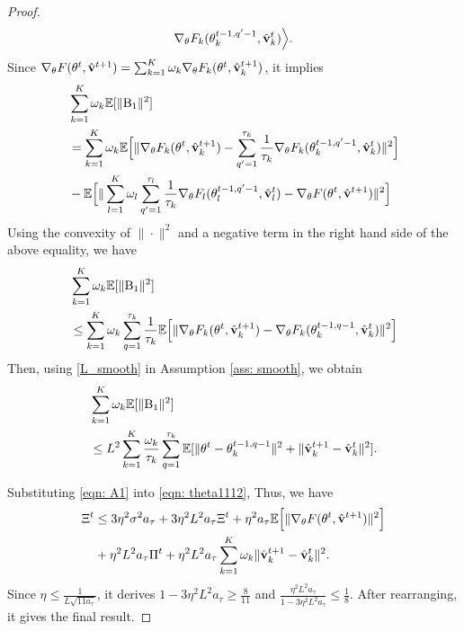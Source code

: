 \documentclass[twoside,journal]{IEEEtran}
\def\VectorFont{\bf}
\newcommand{\vv}{{\VectorFont v}}
\begin{document}
\begin{proof}
\begin{align}
\nabla_{\theta} F_k(\theta_k^{t-1,q^\prime-1}, \hat \vv_k^{t})\Big\rangle.
\end{align}
Since $\nabla_{\theta}F(\theta^{t},\hat{\vv}^{t+1})=\sum_{k=1}^K\omega_k\nabla_{\theta}F_k(\theta^{t},\hat{\vv}_k^{t+1})
$, it implies
\begin{align}
\nonumber&\sum_{k=1}^K\omega_k\mathbb{E}[\|\textmd{B}_1\|^2] \\
\nonumber&=
\sum_{k=1}^K\omega_k
\mathbb{E}\Big[\|
\nabla_{\theta}F_k(\theta^{t},\hat{\vv}_k^{t+1})
-
\sum_{q^\prime=1}^{\tau_k}\frac{1}{\tau_k}
\nabla_{\theta} F_k(\theta_k^{t-1,q^\prime-1}, \hat \vv_k^{t})\|^2\Big]\\
\nonumber&-\mathbb{E}\Big[\|
\sum_{l=1}^K\omega_l\sum_{q^\prime=1}^{\tau_l}\frac{1}{\tau_k}
\nabla_{\theta} F_l(\theta_l^{t-1,q^\prime-1}, \hat \vv_l^{t})
-\nabla_{\theta}F(\theta^{t},\hat{\vv}^{t+1})\|^2\Big]
\end{align}
Using the convexity of $\|\cdot\|^2$ and a negative term in the right hand side of the above equality, we have
\begin{align}
\nonumber&\sum_{k=1}^K\omega_k\mathbb{E}[\|\textmd{B}_1\|^2] \\
\nonumber&\leq \sum_{k=1}^K\omega_k\sum_{q=1}^{\tau_k}\frac{1}{\tau_k}
\mathbb{E}\Big[\|
\nabla_{\theta}F_k(\theta^{t},\hat{\vv}_k^{t+1})
-
\nabla_{\theta} F_k(\theta_k^{t-1,q-1}, \hat \vv_k^{t})\|^2\Big]
\end{align}
Then, using \eqref{L_smooth} in Assumption \ref{ass: smooth}, we obtain
\begin{align}
\nonumber&\sum_{k=1}^K\omega_k\mathbb{E}[\|\textmd{B}_1\|^2]\\
&\leq L^2\sum_{k=1}^K\frac{\omega_k}{\tau_k}\sum_{q=1}^{\tau_k}
\mathbb{E}[\|\theta^{t}-\theta_k^{t-1,q-1}\|^2+\|\hat{\vv}_k^{t+1}-
\hat \vv_k^{t}\|^2].
\end{align}


Substituting \eqref{eqn: A1} into \eqref{eqn: theta1112},
Thus, we have
\begin{align}\label{eqn: theta11}
\nonumber\Xi^t &\leq 3\eta^2\sigma^2a_{\tau}+3\eta^2L^2a_{\tau}\Xi^t+\eta^2a_{\tau}\mathbb{E}\Big[\|
\nabla_{\theta}F(\theta^{t},\hat{\vv}^{t+1})
\|^2\Big]\\
&+\eta^2L^2a_{\tau}\Pi^{t}+\eta^2L^2a_{\tau}\sum_{k=1}^K\omega_k\|\hat{\vv}_k^{t+1}-
\hat \vv_k^{t}\|^2.
\end{align}
Since $\eta\leq \frac{1}{L\sqrt{11a_{\tau}}}$, it derives $1-3\eta^2L^2a_{\tau}\geq \frac{8}{11}$ and $\frac{\eta^2L^2a_{\tau}}{1-3\eta^2L^2a_{\tau}}\leq \frac{1}{8}$.
After rearranging, it gives the final result.
\end{proof}
\end{document}
